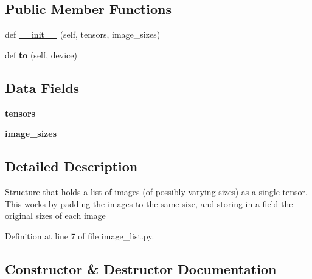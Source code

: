 \subsection*{Public Member Functions}
\begin{DoxyCompactItemize}
\item 
def \hyperlink{classtorchvision_1_1models_1_1detection_1_1image__list_1_1ImageList_af7940d70b44894df9a3f2d94a09c0eb3}{\+\_\+\+\_\+init\+\_\+\+\_\+} (self, tensors, image\+\_\+sizes)
\item 
\mbox{\label{classtorchvision_1_1models_1_1detection_1_1image__list_1_1ImageList_a1203ccc0d30d406bc12b82ad14038b1f}} 
def {\bfseries to} (self, device)
\end{DoxyCompactItemize}
\subsection*{Data Fields}
\begin{DoxyCompactItemize}
\item 
\mbox{\label{classtorchvision_1_1models_1_1detection_1_1image__list_1_1ImageList_a12fc8a171269847c9a7b75f94a49a737}} 
{\bfseries tensors}
\item 
\mbox{\label{classtorchvision_1_1models_1_1detection_1_1image__list_1_1ImageList_a8ef35a7a8e7468a831442d6be49729dc}} 
{\bfseries image\+\_\+sizes}
\end{DoxyCompactItemize}


\subsection{Detailed Description}
\begin{DoxyVerb}Structure that holds a list of images (of possibly
varying sizes) as a single tensor.
This works by padding the images to the same size,
and storing in a field the original sizes of each image
\end{DoxyVerb}
 

Definition at line 7 of file image\+\_\+list.\+py.



\subsection{Constructor \& Destructor Documentation}
\mbox{\label{classtorchvision_1_1models_1_1detection_1_1image__list_1_1ImageList_af7940d70b44894df9a3f2d94a09c0eb3}} 
